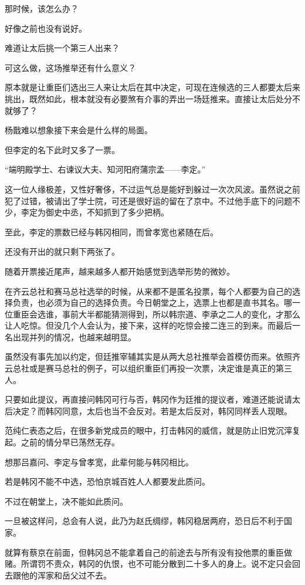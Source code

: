 那时候，该怎么办？

好像之前也没有说好。

难道让太后挑一个第三人出来？

可这么做，这场推举还有什么意义？

原本就是让重臣们选出三人来让太后在其中决定，可现在连候选的三人都要太后来挑出，既然如此，根本就没有必要煞有介事的弄出一场廷推来。直接让太后处分不就够了？

杨戬难以想象接下来会是什么样的局面。

但李定的名下此时又多了一票。

“端明殿学士、右谏议大夫、知河阳府蒲宗孟——李定。”

这一位人缘极差，又性好奢侈，不过运气总是能好到躲过一次次风波。虽然说之前犯了过错，被请出了学士院，可还是很好运的留在了京中。不过他手底下的问题不少，李定为御史中丞，不知抓到了多少把柄。

至此，李定的票数已经与韩冈相同，而曾孝宽也紧随在后。

还没有开出的就只剩下两张了。

随着开票接近尾声，越来越多人都开始感觉到选举形势的微妙。

在齐云总社和赛马总社选举的时候，从来都不是匿名投票，每个人都要为自己的选择负责，也必须为自己的选择负责。今日朝堂之上，选票上也都是直书其名。哪一位重臣会选谁，事前大半都能猜测得到，所以韩宗道、李承之二人的变化，才那么让人吃惊。但没几个人会认为，接下来，这样的吃惊会接二连三的到来。而最后一名出现并列的情况，也越来越明显。

虽然没有事先加以约定，但廷推宰辅其实是从两大总社推举会首模仿而来。依照齐云总社或是赛马总社的例子，可以组织重臣们再投一次票，决定谁是真正的第三人。

只要如此提议，再直接问韩冈可行与否，韩冈作为廷推的提议者，难道还能说请太后决定？而韩冈同意，太后也当不会反对。若是太后反对，韩冈同样丢人现眼。

范纯仁表态之后，在很多新党成员的眼中，打击韩冈的威信，就是防止旧党沉滓复起。之前的情分早已荡然无存。

想那吕嘉问、李定与曾孝宽，此辈何能与韩冈相比。

若是韩冈不能不中选，恐怕京城百姓人人都要发此质问。

不过在朝堂上，决不能如此质问。

一旦被这样问，总会有人说，此乃为赵氏绸缪，韩冈稳居两府，恐日后不利于国家。

就算有蔡京在前面，但韩冈总不能拿着自己的前途去与所有没有投他票的重臣做赌。所谓罚不责众，韩冈的仇恨，也不可能分散到二十多人的身上。说不定只会回去跟他的浑家和岳父过不去。


